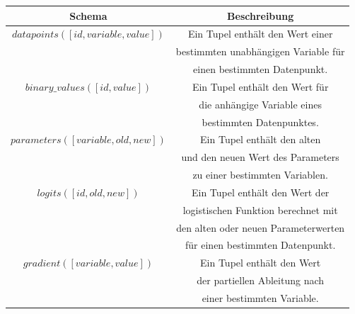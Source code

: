 \begin{center}
  \begin{tabular}{|c|c|}\hline
    \textbf{Schema} & \textbf{Beschreibung} \\ \hline
    $datapoints([id, variable, value])$ & Ein Tupel enthält den Wert einer \\
    & bestimmten unabhängigen Variable für \\
    & einen bestimmten Datenpunkt. \\ \hline
    $binary\_values([id, value])$ & Ein Tupel enthält den Wert für \\
    & die anhängige Variable eines \\
    & bestimmten Datenpunktes. \\ \hline
    $parameters([variable, old, new])$ & Ein Tupel enthält den alten \\
    & und den neuen Wert des Parameters \\
    & zu einer bestimmten Variablen. \\ \hline
    $logits([id, old, new])$ & Ein Tupel enthält den Wert der \\
    & logistischen Funktion berechnet mit \\
    & den alten oder neuen Parameterwerten \\
    & für einen bestimmten Datenpunkt. \\ \hline
    $gradient([variable, value])$ & Ein Tupel enthält den Wert \\
    & der partiellen Ableitung nach \\
    & einer bestimmten Variable. \\ \hline
  \end{tabular}
\end{center}

